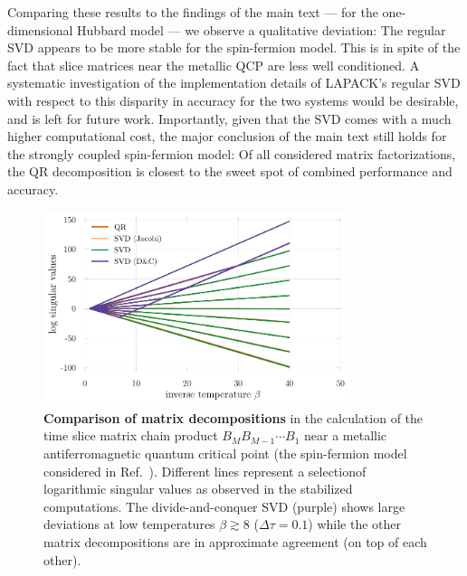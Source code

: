 \documentclass[submission, Phys]{SciPost}
\begin{document}
\begin{appendix}
Comparing these results to the findings of the main text — for the one-dimensional Hubbard model — we observe a qualitative deviation: The regular SVD appears to be more stable for the spin-fermion model. This is in spite of the fact that slice matrices near the metallic QCP are less well conditioned. A systematic investigation of the implementation details of LAPACK's regular SVD with respect to this disparity in accuracy for the two systems would be desirable, and is left for future work. Importantly, given that the SVD comes with a much higher computational cost, the major conclusion of the main text still holds for the strongly coupled spin-fermion model: Of all considered matrix factorizations, the QR decomposition is closest to the sweet spot of combined performance and accuracy.


\begin{figure}
	\centering
	\includegraphics[width=0.8\textwidth]{figures/decomp_comparison_simple_sdw.pdf}
	\caption{\textbf{Comparison of matrix decompositions} in the calculation of the time slice matrix chain product $B_M B_{M-1} \cdots B_1$ near a metallic antiferromagnetic quantum critical point (the spin-fermion model considered in Ref.~\cite{Bauer2020}). Different lines represent a selection\protect\footnotemark of logarithmic singular values as observed in the stabilized computations. The divide-and-conquer SVD (purple) shows large deviations at low temperatures $\beta \gtrsim 8$ ($\Delta \tau = 0.1$) while the other matrix decompositions are in approximate agreement (on top of each other).}
	\label{fig:decomp_comparison_simple_sdw}
\end{figure}


\end{appendix}
\end{document}
